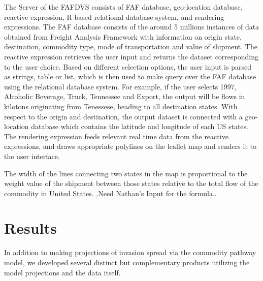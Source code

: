 \documentclass[12pt]{article}
\begin{document}
The Server of the FAFDVS consists of FAF database, geo-location database, reactive expression, R based relational database system, and rendering expressions. The FAF database consists of the around 5 millions instances of data obtained from Freight Analysis Framework with information on origin state, destination, commodity type, mode of transportation and value of shipment. The reactive expression retrieves the user input and returns the dataset corresponding to the user choice. Based on different selection options, the user input is parsed as strings, table or list, which is then used to make query over the FAF database using the relational database system.  For example, if the user selects 1997, Alcoholic Beverage, Truck, Tennessee and Export, the output will be flows in kilotons originating from Tenessese, heading to all destination states. With respect to the origin and destination, the output dataset is connected with a geo-location database which contains the latitude and longitude of each US states.  The rendering expression feeds relevant real time data from the reactive expressions, and draws appropriate polylines on the leaflet map and renders it to the user interface.  

The width of the lines connecting two states in the map is proportional to the weight value of the shipment between those states relative to the total flow of the commodity in United States.  ‚Need Nathan's Input for the formula..


\section*{Results}

In addition to making projections of invasion spread via the commodity pathway model, we developed several distinct but complementary products utilizing the model projections and the data itself.
\end{document}
